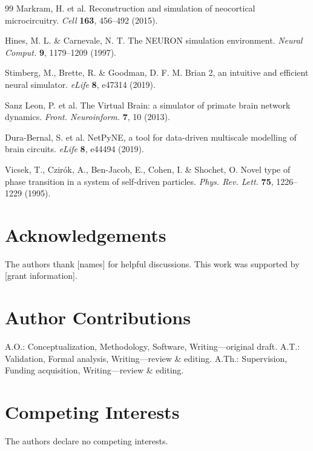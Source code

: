 \documentclass[12pt,a4paper]{article}
\begin{document}
\begin{thebibliography}{99}
Markram, H. et al.
Reconstruction and simulation of neocortical microcircuitry.
\textit{Cell} \textbf{163}, 456--492 (2015).

Hines, M. L. \& Carnevale, N. T.
The NEURON simulation environment.
\textit{Neural Comput.} \textbf{9}, 1179--1209 (1997).

Stimberg, M., Brette, R. \& Goodman, D. F. M.
Brian 2, an intuitive and efficient neural simulator.
\textit{eLife} \textbf{8}, e47314 (2019).

Sanz Leon, P. et al.
The Virtual Brain: a simulator of primate brain network dynamics.
\textit{Front. Neuroinform.} \textbf{7}, 10 (2013).

Dura-Bernal, S. et al.
NetPyNE, a tool for data-driven multiscale modelling of brain circuits.
\textit{eLife} \textbf{8}, e44494 (2019).

Vicsek, T., Czir\'ok, A., Ben-Jacob, E., Cohen, I. \& Shochet, O.
Novel type of phase transition in a system of self-driven particles.
\textit{Phys. Rev. Lett.} \textbf{75}, 1226--1229 (1995).

\end{thebibliography}

\section*{Acknowledgements}
The authors thank [names] for helpful discussions.
This work was supported by [grant information].

\section*{Author Contributions}
A.O.: Conceptualization, Methodology, Software, Writing---original draft.
A.T.: Validation, Formal analysis, Writing---review \& editing.
A.Th.: Supervision, Funding acquisition, Writing---review \& editing.

\section*{Competing Interests}
The authors declare no competing interests.
\end{document}
